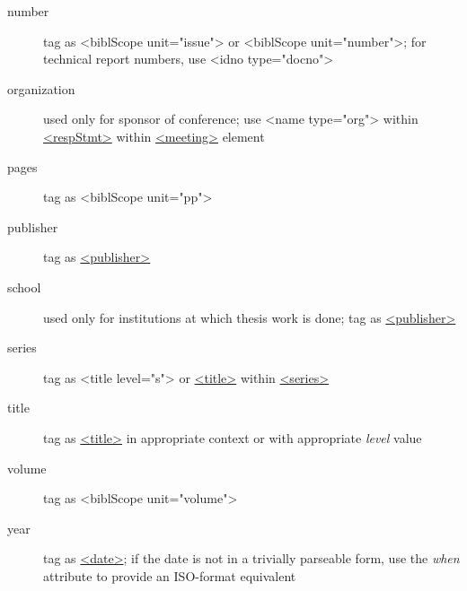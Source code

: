 \begin{description}
\item[{number}]tag as <biblScope unit="issue"> or <biblScope unit="number">; for technical report numbers, use <idno type="docno">
\item[{organization}]used only for sponsor of conference; use <name type="org"> within \hyperref[TEI.respStmt]{<respStmt>} within \hyperref[TEI.meeting]{<meeting>} element
\item[{pages}]tag as <biblScope unit="pp">
\item[{publisher}]tag as \hyperref[TEI.publisher]{<publisher>}
\item[{school}]used only for institutions at which thesis work is done; tag as \hyperref[TEI.publisher]{<publisher>}
\item[{series}]tag as <title level="s"> or \hyperref[TEI.title]{<title>} within \hyperref[TEI.series]{<series>}
\item[{title}]tag as \hyperref[TEI.title]{<title>} in appropriate context or with appropriate {\itshape level} value
\item[{volume}]tag as <biblScope unit="volume">
\item[{year}]tag as \hyperref[TEI.date]{<date>}; if the date is not in a trivially parseable form, use the {\itshape when} attribute to provide an ISO-format equivalent
\end{description} 
